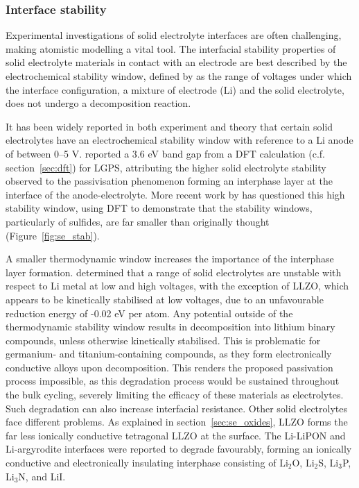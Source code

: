 \documentclass[../main.tex]{subfiles}
\begin{document}
\subsubsection{Interface stability}
\label{sec:interface_stability}
Experimental investigations of solid electrolyte interfaces are often challenging, making atomistic modelling a vital tool.\cite{Xu2018exp} The interfacial stability properties of solid electrolyte materials in contact with an electrode are best described by the electrochemical stability window, defined by \citeauthor{Zhu2016} as the range of voltages under which the interface configuration, a mixture of electrode (Li) and the solid electrolyte, does not undergo a decomposition reaction.\cite{Zhu2016}

It has been widely reported in both experiment\cite{Liu2013, Han2015} and theory\cite{Mo2012} that certain solid electrolytes have an electrochemical stability window with reference to a Li anode of between 0--5 V.\cite{Kamaya2011, Thangadurai2005, Liu2013} \citeauthor{Mo2012} reported a 3.6 eV band gap from a DFT calculation (c.f. section~\ref{sec:dft}) for LGPS,\cite{Mo2012} attributing the higher solid electrolyte stability observed to the passivisation phenomenon forming an interphase layer at the interface of the anode-electrolyte.\cite{Kobayashi2008} More recent work by \citeauthor{Zhu2015} has questioned this high stability window, using DFT to demonstrate that the stability windows, particularly of sulfides, are far smaller than originally thought (Figure~\ref{fig:se_stab}).\cite{Zhu2015} 

A smaller thermodynamic window increases the importance of the interphase layer formation. \citeauthor{Zhu2015} determined that a range of solid electrolytes are unstable with respect to Li metal at low and high voltages, with the exception of LLZO, which appears to be kinetically stabilised at low voltages, due to an unfavourable reduction energy of -0.02 eV per atom. Any potential outside of the thermodynamic stability window results in decomposition into lithium binary compounds, unless otherwise kinetically stabilised. This is problematic for germanium- and titanium-containing compounds, as they form electronically conductive alloys upon decomposition.\cite{Zhu2015} This renders the proposed passivation process impossible,\cite{Mo2012, Zhu2015} as this degradation process would be sustained throughout the bulk cycling, severely limiting the efficacy of these materials as electrolytes. Such degradation can also increase interfacial resistance.\cite{Takada2008, Sakuda2010} Other solid electrolytes face different problems. As explained in section~\ref{sec:se_oxides}, LLZO forms the far less ionically conductive tetragonal LLZO at the surface. The Li-LiPON and Li-argyrodite interfaces were reported to degrade favourably, forming an ionically conductive and electronically insulating interphase consisting of Li$_2$O, Li$_2$S, Li$_3$P, Li$_3$N, and LiI.\cite{Zhu2015}
\end{document}
